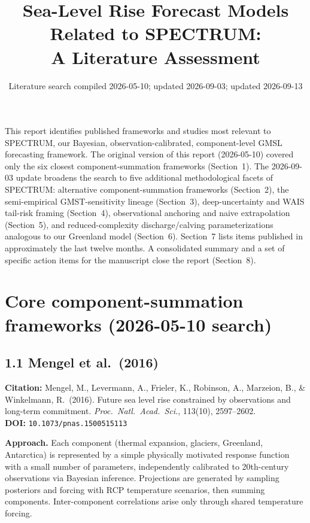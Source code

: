 \documentclass[11pt]{article}
\title{Sea-Level Rise Forecast Models Related to SPECTRUM:\\A Literature Assessment}
\author{Literature search compiled 2026-05-10; updated 2026-09-03; updated 2026-09-13}
\date{}
\begin{document}
\maketitle

\noindent This report identifies published frameworks and studies most
relevant to SPECTRUM, our Bayesian, observation-calibrated, component-level
GMSL forecasting framework. The original version of this report (2026-05-10)
covered only the six closest component-summation frameworks (Section~1). The
2026-09-03 update broadens the search to five additional methodological
facets of SPECTRUM: alternative component-summation frameworks (Section~2),
the semi-empirical GMST-sensitivity lineage (Section~3), deep-uncertainty and
WAIS tail-risk framing (Section~4), observational anchoring and naive
extrapolation (Section~5), and reduced-complexity discharge/calving
parameterizations analogous to our Greenland model (Section~6). Section~7
lists items published in approximately the last twelve months. A
consolidated summary and a set of specific action items for the manuscript
close the report (Section~8).

\section{Core component-summation frameworks (2026-05-10 search)}

\subsection*{1.1 Mengel et al.\ (2016)}

\noindent\textbf{Citation:} Mengel, M., Levermann, A., Frieler, K.,
Robinson, A., Marzeion, B., \& Winkelmann, R.\ (2016). Future sea level
rise constrained by observations and long-term commitment.
\textit{Proc.\ Natl.\ Acad.\ Sci.}, 113(10), 2597--2602.\\
\textbf{DOI:} \texttt{10.1073/pnas.1500515113}

\noindent\textbf{Approach.} Each component (thermal expansion, glaciers,
Greenland, Antarctica) is represented by a simple physically motivated
response function with a small number of parameters, independently
calibrated to 20th-century observations via Bayesian inference. Projections
are generated by sampling posteriors and forcing with RCP temperature
scenarios, then summing components. Inter-component correlations arise only
through shared temperature forcing.
\end{document}
